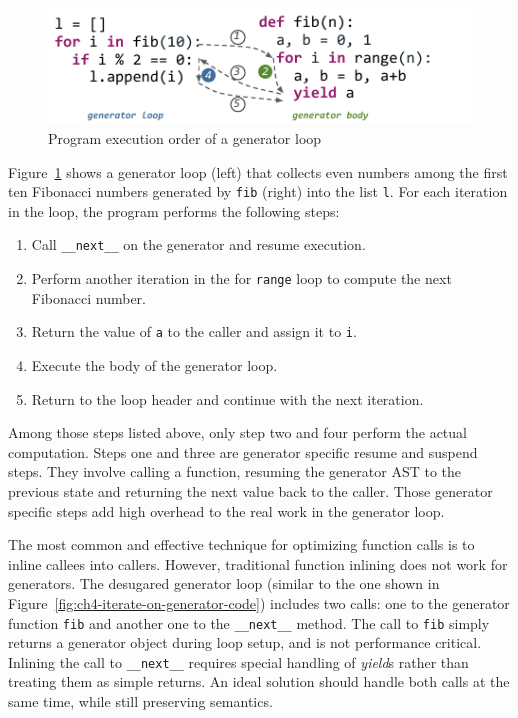 \begin{figure}[ht]
\centering
\includegraphics[scale=1.5]{figures/ch4-gen-exec-order}
\caption{Program execution order of a generator loop}
\label{fig:ch4-gen-exec-order}
\end{figure}

Figure~\ref{fig:ch4-gen-exec-order} shows a generator loop (left) that collects even numbers among the first ten Fibonacci numbers generated by \texttt{fib} (right) into the list \texttt{l}.
For each iteration in the loop, the program performs the following steps:

\begin{enumerate}
\item Call \texttt{\_\_next\_\_} on the generator and resume execution.

\item Perform another iteration in the for \texttt{range} loop to compute the next Fibonacci number.

\item Return the value of \texttt{a} to the caller and assign it to \texttt{i}.

\item Execute the body of the generator loop.

\item Return to the loop header and continue with the next iteration.
\end{enumerate}

Among those steps listed above, only step two and four perform the actual computation.
Steps one and three are generator specific resume and suspend steps.
They involve calling a function, resuming the generator AST to the previous state and returning the next value back to the caller.
Those generator specific steps add high overhead to the real work in the generator loop.

The most common and effective technique for optimizing function calls is to inline callees into callers.
However, traditional function inlining does not work for generators.
The desugared generator loop (similar to the one shown in Figure~\ref{fig:ch4-iterate-on-generator-code}) includes two calls: one to the generator function \texttt{fib} and another one to the \texttt{\_\_next\_\_} method.
The call to \texttt{fib} simply returns a generator object during loop setup, and is not performance critical.
Inlining the call to \texttt{\_\_next\_\_} requires special handling of \emph{yield}s rather than treating them as simple returns.
An ideal solution should handle both calls at the same time, while still preserving semantics.

